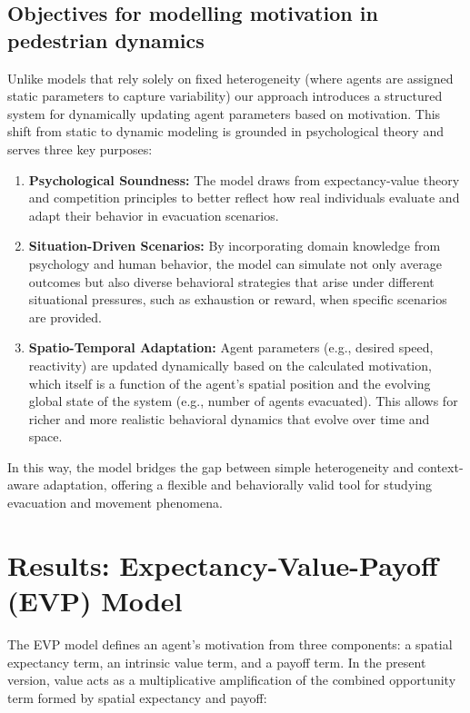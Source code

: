 \documentclass[pdflatex,sn-mathphys-num]{sn-jnl}%
\theoremstyle{thmstyleone}%
\theoremstyle{thmstyletwo}%
\theoremstyle{thmstylethree}%
\begin{document}
\subsection{Objectives for modelling motivation in pedestrian dynamics}
Unlike models that rely solely on fixed heterogeneity (where agents are assigned static parameters to capture variability) our approach introduces a structured system for dynamically updating agent parameters based on motivation. This shift from static to dynamic modeling is grounded in psychological theory and serves three key purposes:

\begin{enumerate}
    \item \textbf{Psychological Soundness:} The model draws from expectancy-value theory and competition principles to better reflect how real individuals evaluate and adapt their behavior in evacuation scenarios.
    
    \item \textbf{Situation-Driven Scenarios:} By incorporating domain knowledge from psychology and human behavior, the model can simulate not only average outcomes but also diverse behavioral strategies that arise under different situational pressures, such as exhaustion or reward, when specific scenarios are provided.
    
    \item \textbf{Spatio-Temporal Adaptation:} Agent parameters (e.g., desired speed, reactivity) are updated dynamically based on the calculated motivation, which itself is a function of the agent’s spatial position and the evolving global state of the system (e.g., number of agents evacuated). This allows for richer and more realistic behavioral dynamics that evolve over time and space.
\end{enumerate}

In this way, the model bridges the gap between simple heterogeneity and context-aware adaptation, offering a flexible and behaviorally valid tool for studying evacuation and movement phenomena.

\section{Results: Expectancy-Value-Payoff (EVP) Model}
\label{sec:results}
The EVP model defines an agent's motivation from three components: a
spatial expectancy term, an intrinsic value term, and a payoff term. In
the present version, value acts as a multiplicative amplification of the
combined opportunity term formed by spatial expectancy and payoff:
\end{document}
